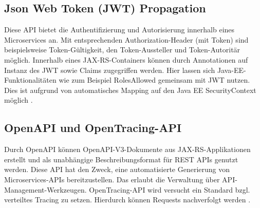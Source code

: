 \subsection{Json Web Token (JWT) Propagation}
Diese API bietet die Authentifizierung und Autorisierung innerhalb eines Microservices an. Mit entsprechenden Authorization-Header (mit Token) sind beispielsweise Token-Gültigkeit, den Token-Aussteller und Token-Autoritär möglich. Innerhalb eines JAX-RS-Containers können durch Annotationen auf Instanz des JWT sowie Claims zugegriffen werden. Hier lassen sich Java-EE-Funktionalitäten wie zum Beispiel RolesAllowed gemeinsam mit JWT nutzen. Dies ist aufgrund von automatisches Mapping auf den Java EE SecurityContext möglich \cite{LarsRowekamp.2017b}. 


\subsection{OpenAPI und OpenTracing-API}
Durch OpenAPI können OpenAPI-V3-Dokumente aus JAX-RS-Applikationen erstellt und als unabhängige Beschreibungsformat für REST APIs genutzt werden. Diese API hat den Zweck, eine automatisierte Generierung von Microservices-APIs bereitzustellen. Das erlaubt die Verwaltung über API-Management-Werkzeugen.
OpenTracing-API wird versucht ein Standard bzgl. verteiltes Tracing zu setzen. Hierdurch können Requests nachverfolgt werden \cite{DominikMohilo2018}.  


